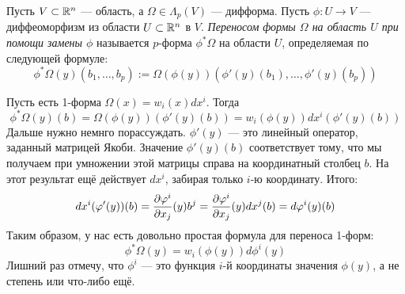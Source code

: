 \begin{definition}
	Пусть $V \subset \mathbb{R}^n$ --- область, а $\Omega \in \Lambda_p(V)$ --- дифформа. Пусть $\phi \colon U \to V$ --- диффеоморфизм из области $U \subset \mathbb{R}^n$ в $V$. \textit{Переносом формы $\Omega$ на область $U$ при помощи замены $\phi$} называется $p$-форма $\phi^*\Omega$ на области $U$, определяемая по следующей формуле:
	\[
		\phi^*\Omega(y)(b_1, \ldots, b_p) := \Omega(\phi(y))(\phi'(y)(b_1), \ldots, \phi'(y)(b_p))
	\]
\end{definition}

\begin{example}
	Пусть есть 1-форма $\Omega(x) = w_i(x)dx^i$. Тогда
	\[
		\phi^*\Omega(y)(b) = \Omega(\phi(y))(\phi'(y)(b)) = w_i(\phi(y)) dx^i(\phi'(y)(b))
	\]
	Дальше нужно немнго порассуждать. $\phi'(y)$ --- это линейный оператор, заданный матрицей Якоби. Значение $\phi'(y)(b)$ соответствует тому, что мы получаем при умножении этой матрицы справа на координатный столбец $b$. На этот результат ещё действует $dx^i$, забирая только $i$-ю координату. Итого:
	\[
		dx^i(\varphi'(y))(b) = \frac{\partial \varphi^i}{\partial x_j}(y) b^j = \frac{\partial \varphi^i}{\partial x_j}(y) dx^j(b) = d\varphi^i(y)(b)
	\]
	Таким образом, у нас есть довольно простая формула для переноса 1-форм:
	\[
		\phi^*\Omega(y) = w_i(\phi(y)) d\phi^i(y)
	\]
	Лишний раз отмечу, что $\phi^i$ --- это функция $i$-й координаты значения $\phi(y)$, а не степень или что-либо ещё.
\end{example}